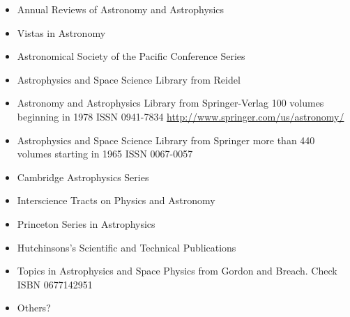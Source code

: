 \documentclass{article}
\begin{document}
\begin{itemize}
\item Annual Reviews of Astronomy and Astrophysics
\item Vistas in Astronomy
\item Astronomical Society of the Pacific Conference Series
\item Astrophysics and Space Science Library from Reidel
\item Astronomy and Astrophysics Library from Springer-Verlag
  100 volumes beginning in 1978 ISSN 0941-7834
  \url{http://www.springer.com/us/astronomy/}
\item Astrophysics and Space Science Library from Springer
  more than 440 volumes starting in 1965 ISSN 0067-0057
\item Cambridge Astrophysics Series
\item Interscience Tracts on Physics and Astronomy
\item Princeton Series in Astrophysics
\item Hutchinsons's Scientific and Technical Publications
\item Topics in Astrophysics and Space Physics from Gordon and Breach. Check ISBN 0677142951
  
\item Others?
\end{itemize}
\end{document}
